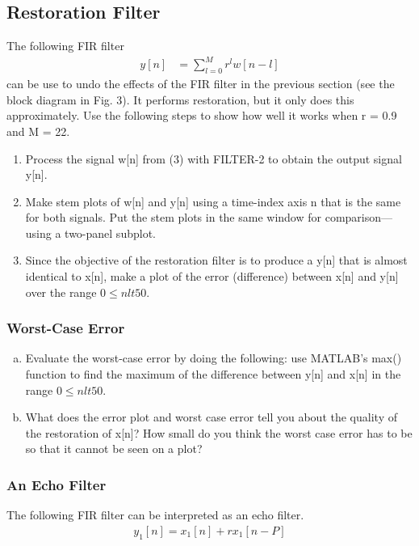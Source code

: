 \subsection{Restoration Filter}
The following FIR filter
\begin{align}
	y[n] &= \sum_{l=0}^M r^l w[n-l]
\end{align}
can be use to undo the effects of the FIR filter in the previous section (see the block diagram in Fig. 3). It
performs restoration, but it only does this approximately. Use the following steps to show how well it works when r = 0.9 and M = 22.
\begin{enumerate}
\item Process the signal w[n] from (3) with FILTER-2 to obtain the output signal y[n].
	
\item  Make stem plots of w[n] and y[n] using a time-index axis n that is the same for both signals. Put the
	stem plots in the same window for comparison—using a two-panel subplot.

\item Since the objective of the restoration filter is to produce a y[n] that is almost identical to x[n], make a plot of the error (difference) between x[n] and y[n] over the range $0 \le n lt 50$.
	
\end{enumerate}


\subsubsection{Worst-Case Error}
\begin{enumerate}[a)]
\item Evaluate the worst-case error by doing the following: use MATLAB’s max() function to find the
	maximum of the difference between y[n] and x[n] in the range $0 \le n lt 50$.

\item What does the error plot and worst case error tell you about the quality of the restoration of x[n]?
	How small do you think the worst case error has to be so that it cannot be seen on a plot?	
\end{enumerate}


\subsubsection{An Echo Filter}
The following FIR filter can be interpreted as an echo filter.
\begin{align}
	y_1[n] = x_1[n] + r x_1[n-P]
\end{align}

